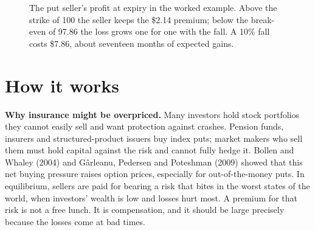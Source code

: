 \begin{figure}[htbp]
\centering
{}
\caption{The put seller's profit at expiry in the worked example. Above the strike of 100 the seller keeps the \$2.14 premium; below the break-even of 97.86 the loss grows one for one with the fall. A 10\% fall costs \$7.86, about seventeen months of expected gains.}
\label{fig:16-put}
\end{figure}

\section{How it works}
\label{sec:16-how}

\textbf{Why insurance might be overpriced.} Many investors hold stock portfolios they cannot easily sell and want protection against crashes. Pension funds, insurers and structured-product issuers buy index puts; market makers who sell them must hold capital against the risk and cannot fully hedge it. Bollen and Whaley (2004) and G\^arleanu, Pedersen and Poteshman (2009) showed that this net buying pressure raises option prices, especially for out-of-the-money puts. In equilibrium, sellers are paid for bearing a risk that bites in the worst states of the world, when investors' wealth is low and losses hurt most. A premium for that risk is not a free lunch. It is compensation, and it should be large precisely because the losses come at bad times.

